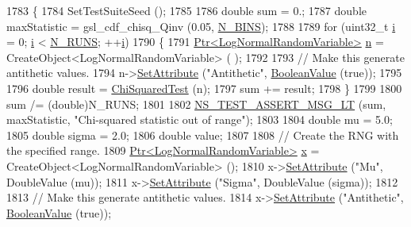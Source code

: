 \begin{DoxyCode}
1783 \{
1784   SetTestSuiteSeed ();
1785 
1786   \textcolor{keywordtype}{double} sum = 0.;
1787   \textcolor{keywordtype}{double} maxStatistic = gsl\_cdf\_chisq\_Qinv (0.05, \hyperlink{classRandomVariableStreamLogNormalAntitheticTestCase_ae77d74151c86fca9b393757cf5c222f9}{N\_BINS});
1788 
1789   \textcolor{keywordflow}{for} (uint32\_t \hyperlink{bernuolliDistribution_8m_a6f6ccfcf58b31cb6412107d9d5281426}{i} = 0; \hyperlink{bernuolliDistribution_8m_a6f6ccfcf58b31cb6412107d9d5281426}{i} < \hyperlink{classRandomVariableStreamLogNormalAntitheticTestCase_aab97d250723c997e23fb335f8791b6c9}{N\_RUNS}; ++\hyperlink{bernuolliDistribution_8m_a6f6ccfcf58b31cb6412107d9d5281426}{i})
1790     \{
1791       \hyperlink{classns3_1_1Ptr}{Ptr<LogNormalRandomVariable>} \hyperlink{namespacesample-rng-plot_aeb5ee5c431e338ef39b7ac5431242e1d}{n} = CreateObject<LogNormalRandomVariable> (
      );
1792 
1793       \textcolor{comment}{// Make this generate antithetic values.}
1794       n->\hyperlink{classns3_1_1ObjectBase_ac60245d3ea4123bbc9b1d391f1f6592f}{SetAttribute} (\textcolor{stringliteral}{"Antithetic"}, \hyperlink{classns3_1_1BooleanValue}{BooleanValue} (\textcolor{keyword}{true}));
1795 
1796       \textcolor{keywordtype}{double} result = \hyperlink{classRandomVariableStreamLogNormalAntitheticTestCase_acea054fec1e48e3d210b5b378c63f110}{ChiSquaredTest} (n);
1797       sum += result;
1798     \}
1799 
1800   sum /= (double)N\_RUNS;
1801 
1802   \hyperlink{group__testing_ga1d96848b91407c9a0b36583e8b0ad7ae}{NS\_TEST\_ASSERT\_MSG\_LT} (sum, maxStatistic, \textcolor{stringliteral}{"Chi-squared statistic out of range"});
1803 
1804   \textcolor{keywordtype}{double} mu = 5.0;
1805   \textcolor{keywordtype}{double} sigma = 2.0;
1806   \textcolor{keywordtype}{double} value;
1807 
1808   \textcolor{comment}{// Create the RNG with the specified range.}
1809   \hyperlink{classns3_1_1Ptr}{Ptr<LogNormalRandomVariable>} \hyperlink{lte__link__budget__x2__handover__measures_8m_a9336ebf25087d91c818ee6e9ec29f8c1}{x} = CreateObject<LogNormalRandomVariable> ();
1810   x->\hyperlink{classns3_1_1ObjectBase_ac60245d3ea4123bbc9b1d391f1f6592f}{SetAttribute} (\textcolor{stringliteral}{"Mu"}, DoubleValue (mu));
1811   x->\hyperlink{classns3_1_1ObjectBase_ac60245d3ea4123bbc9b1d391f1f6592f}{SetAttribute} (\textcolor{stringliteral}{"Sigma"}, DoubleValue (sigma));
1812 
1813   \textcolor{comment}{// Make this generate antithetic values.}
1814   x->\hyperlink{classns3_1_1ObjectBase_ac60245d3ea4123bbc9b1d391f1f6592f}{SetAttribute} (\textcolor{stringliteral}{"Antithetic"}, \hyperlink{classns3_1_1BooleanValue}{BooleanValue} (\textcolor{keyword}{true}));

\end{DoxyCode}
